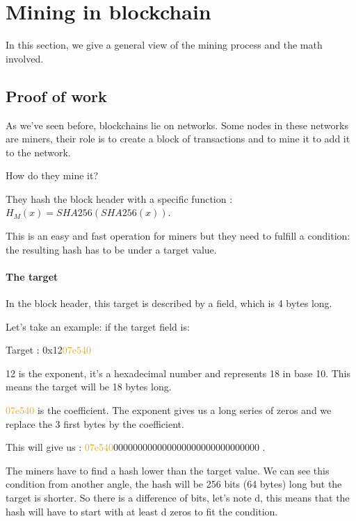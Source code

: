 \section{Mining in blockchain} \label{mining}

In this section, we give a general view of the mining process and the math involved.

  \subsection{Proof of work}

As we've seen before, blockchains lie on networks. Some nodes in these networks are miners, their role is to create a block of transactions and to mine it to add it to the network. \newline

How do they mine it? \newline

They hash the block header with a specific function : $H_M(x) = SHA256(SHA256(x))$.

This is an easy and fast operation for miners but they need to fulfill a condition: the resulting hash has to be under a target value.

  \paragraph{The target} \label{target}

In the block header, this target is described by a field, which is 4 bytes long.

Let's take an example: if the target field is: \newline

Target : 0x12\textcolor{orange}{07e540} \newline

12 is the exponent, it's a hexadecimal number and represents 18 in base 10. This means the target will be 18 bytes long.

\textcolor{orange}{07e540} is the coefficient. The exponent gives us a long series of zeros and we replace the 3 first bytes by the coefficient. \newline

This will give us : \textcolor{orange}{07e540}000000000000000000000000000000 . \newline

The miners have to find a hash lower than the target value. We can see this condition from another angle, the hash will be 256 bits (64 bytes) long but the target is shorter. So there is a difference of bits, let's note d, this means that the hash will have to start with at least d zeros to fit the condition. \newline

